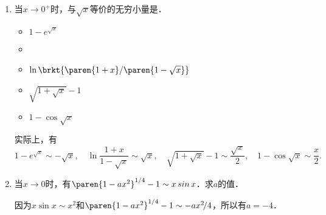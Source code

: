 \begin{enumerate}
\item 当\(x \to 0^+\)时，与\(\sqrt x\)等价的无穷小量是\uline{\makebox[6em]{}}．
  \begin{itemize}
    \renewcommand{\labelitemi}{\faCircleThin}
  \item \(1 - e^{\sqrt x}\)
    \ifshowsol
    \item[\faCircle]
    \else
    \item
    \fi
    \(\ln\brkt{\paren{1+x}/\paren{1-\sqrt x}}\) %
  \item \(\sqrt{1 + \sqrt x} - 1\)
  \item \(1 - \cos\sqrt x\)
  \end{itemize}

  \ifshowsol
    实际上，有
    \begin{equation*}
      1 - e^{\sqrt x} \sim -\sqrt x, \quad
      \ln \frac{1+x}{1-\sqrt x} \sim \sqrt x, \quad
      \sqrt{1 + \sqrt x} - 1 \sim \frac{\sqrt x}{2}, \quad
      1 - \cos\sqrt x \sim \frac x2.
    \end{equation*}
  \fi

\item 当\(x \to 0\)时，有\(\paren{1-ax^2}^{1/4} - 1 \sim x \sin x\)．求\(a\)的值．

  \ifshowsol
    因为\(x \sin x \sim x^2\)和\(\paren{1-ax^2}^{1/4} - 1 \sim -ax^2\!/4\)，所以有\(a = -4\)．
  \fi
\end{enumerate}
\fi

